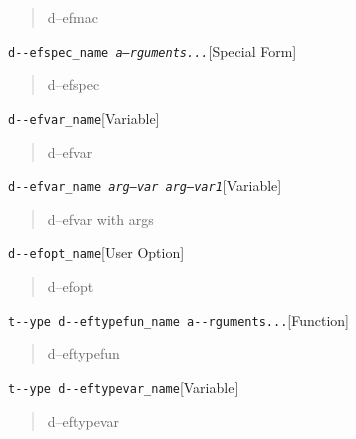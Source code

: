 \documentclass{book}
\begin{document}
%
\begin{quote}
\unskip{\parskip=0pt\noindent}%
d--efmac
\end{quote}

\noindent\texttt{d{-}{-}efspec\_name \EmbracOn{}\textnormal{\textsl{a--rguments...}}\EmbracOff{}}\hfill[Special Form]



%
\begin{quote}
\unskip{\parskip=0pt\noindent}%
d--efspec
\end{quote}

\noindent\texttt{d{-}{-}efvar\_name}\hfill[Variable]



%
\begin{quote}
\unskip{\parskip=0pt\noindent}%
d--efvar
\end{quote}

\noindent\texttt{d{-}{-}efvar\_name \EmbracOn{}\textnormal{\textsl{arg--var arg--var1}}\EmbracOff{}}\hfill[Variable]



%
\begin{quote}
\unskip{\parskip=0pt\noindent}%
d--efvar with args
\end{quote}

\noindent\texttt{d{-}{-}efopt\_name}\hfill[User Option]



%
\begin{quote}
\unskip{\parskip=0pt\noindent}%
d--efopt
\end{quote}

\noindent\texttt{t{-}{-}ype d{-}{-}eftypefun\_name a{-}{-}rguments...}\hfill[Function]



%
\begin{quote}
\unskip{\parskip=0pt\noindent}%
d--eftypefun
\end{quote}

\noindent\texttt{t{-}{-}ype d{-}{-}eftypevar\_name}\hfill[Variable]



%
\begin{quote}
\unskip{\parskip=0pt\noindent}%
d--eftypevar
\end{quote}
\end{document}
